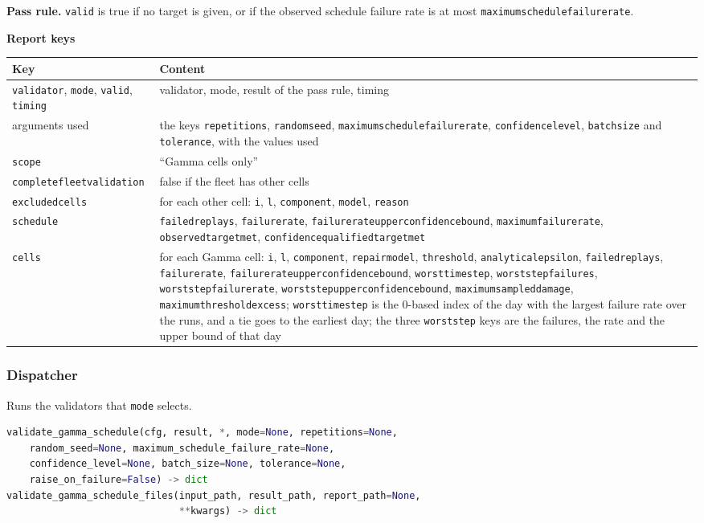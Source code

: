 \documentclass[11pt,a4paper]{article}
\makeatletter
\theoremstyle{plain}
\theoremstyle{definition}
\newcommand{\blockhead}[1]{\par\noindent\textbf{#1}\par\nobreak}
\renewcommand{\_}{\textunderscore\allowbreak{}}
\providecommand{\rejrow}[2]{{\raggedright #1\par} & {\raggedright #2\par} \\}
\providecommand{\tabstart}[2]{\begingroup\small\begin{longtable}{@{}#1@{}}\toprule #2 \\ \midrule \endhead}
\providecommand{\tabend}{\bottomrule\end{longtable}\endgroup}
\makeatother
\begin{document}
\textbf{Pass rule.} \texttt{valid} is true if no target is given, or if the observed schedule failure rate is at most \texttt{maximum\_schedule\_failure\_rate}.

\blockhead{Report keys}
\tabstart{p{5.2cm}p{9.8cm}}{Key & Content}
\rejrow{\texttt{validator}, \texttt{mode}, \texttt{valid}, \texttt{timing}}{validator, mode, result of the pass rule, timing}
\rejrow{arguments used}{the keys \texttt{repetitions}, \texttt{random\_seed}, \texttt{maximum\_schedule\_failure\_rate}, \texttt{confidence\_level}, \texttt{batch\_size} and \texttt{tolerance}, with the values used}
\rejrow{\texttt{scope}}{``Gamma cells only''}
\rejrow{\texttt{complete\_fleet\_validation}}{false if the fleet has other cells}
\rejrow{\texttt{excluded\_cells}}{for each other cell: \texttt{i}, \texttt{l}, \texttt{component}, \texttt{model}, \texttt{reason}}
\rejrow{\texttt{schedule}}{\texttt{failed\_replays}, \texttt{failure\_rate}, \texttt{failure\_rate\_upper\_confidence\_bound}, \texttt{maximum\_failure\_rate}, \texttt{observed\_target\_met}, \texttt{confidence\_qualified\_target\_met}}
\rejrow{\texttt{cells}}{for each Gamma cell: \texttt{i}, \texttt{l}, \texttt{component}, \texttt{repair\_model}, \texttt{threshold}, \texttt{analytical\_epsilon}, \texttt{failed\_replays}, \texttt{failure\_rate}, \texttt{failure\_rate\_upper\_confidence\_bound}, \texttt{worst\_time\_step}, \texttt{worst\_step\_failures}, \texttt{worst\_step\_failure\_rate}, \texttt{worst\_step\_upper\_confidence\_bound}, \texttt{maximum\_sampled\_damage}, \texttt{maximum\_threshold\_excess}; \texttt{worst\_time\_step} is the 0-based index of the day with the largest failure rate over the runs, and a tie goes to the earliest day; the three \texttt{worst\_step\_} keys are the failures, the rate and the upper bound of that day}
\tabend

\subsubsection{Dispatcher}

Runs the validators that \texttt{mode} selects.

\begin{lstlisting}[language=Python]
validate_gamma_schedule(cfg, result, *, mode=None, repetitions=None,
    random_seed=None, maximum_schedule_failure_rate=None,
    confidence_level=None, batch_size=None, tolerance=None,
    raise_on_failure=False) -> dict
validate_gamma_schedule_files(input_path, result_path, report_path=None,
                              **kwargs) -> dict
\end{lstlisting}
\end{document}
